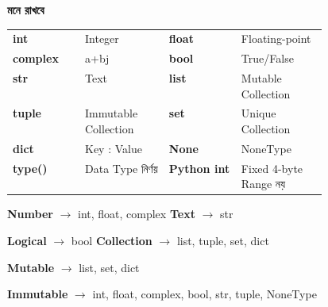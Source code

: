 \begin{rememberbox}

\textbf{\color{deepOrange}মনে রাখবে}

\begin{tabularx}
{\linewidth}
{
>{\bfseries\RaggedRight\arraybackslash}p{0.23\linewidth}
Y
>{\bfseries\RaggedRight\arraybackslash}p{0.23\linewidth}
Y
}

\textenglish{\ttfamily int}
&
Integer
&
\textenglish{\ttfamily float}
&
Floating-point
\\

\textenglish{\ttfamily complex}
&
\textenglish{\ttfamily a+bj}
&
\textenglish{\ttfamily bool}
&
\textenglish{\ttfamily True/False}
\\

\textenglish{\ttfamily str}
&
Text
&
\textenglish{\ttfamily list}
&
Mutable Collection
\\

\textenglish{\ttfamily tuple}
&
Immutable Collection
&
\textenglish{\ttfamily set}
&
Unique Collection
\\

\textenglish{\ttfamily dict}
&
Key : Value
&
\textenglish{\ttfamily None}
&
NoneType
\\

\textenglish{\ttfamily type()}
&
Data Type নির্ণয়
&
Python \textenglish{\ttfamily int}
&
Fixed 4-byte Range নয়
\\

\end{tabularx}

\medskip

\begin{center}

\textbf{Number}
\(\longrightarrow\)
\textenglish{\ttfamily int, float, complex}
\qquad
\textbf{Text}
\(\longrightarrow\)
\textenglish{\ttfamily str}

\medskip

\textbf{Logical}
\(\longrightarrow\)
\textenglish{\ttfamily bool}
\qquad
\textbf{Collection}
\(\longrightarrow\)
\textenglish{\ttfamily list, tuple, set, dict}

\medskip

\textbf{Mutable}
\(\longrightarrow\)
\textenglish{\ttfamily list, set, dict}

\qquad

\textbf{Immutable}
\(\longrightarrow\)
\textenglish{\ttfamily int, float, complex, bool, str, tuple, NoneType}

\end{center}

\end{rememberbox}

\small


